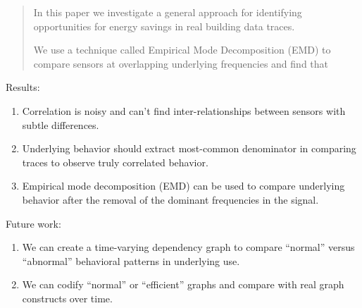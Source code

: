 \begin{abstract}
In this paper we investigate a general approach for identifying opportunities for energy savings
in real building data traces.  

We use a technique called Empirical Mode Decomposition (EMD) to
compare sensors at overlapping underlying frequencies and find that 
\end{abstract}

Results:
\begin{enumerate}
\item Correlation is noisy and can't find inter-relationships between sensors
		with subtle differences.
\item Underlying behavior should extract most-common denominator in comparing traces
		to observe truly correlated behavior.
\item Empirical mode decomposition (EMD) can be used to compare underlying behavior after the
		removal of the dominant frequencies in the signal.
\end{enumerate}

Future work:
\begin{enumerate}
\item We can create a time-varying dependency graph to compare ``normal'' versus ``abnormal'' behavioral
		patterns in underlying use.
\item We can codify ``normal'' or ``efficient'' graphs and compare with real graph constructs over time.
\end{enumerate}